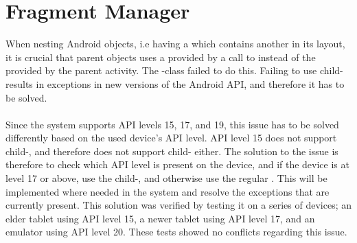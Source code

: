 \section{Fragment Manager}
\label{sec:fragment_manager}

When nesting Android  objects, i.e having a  which contains another  in its layout, it is crucial that parent  objects uses a  provided by a call to  instead of the  provided by the parent activity. The \giraf-class  failed to do this. Failing to use child- results in exceptions in new versions of the Android API, and therefore it has to be solved. 
\\\\

Since the \giraf system supports API levels 15, 17, and 19, this issue has to be solved differently based on the used device's API level. API level 15 does not support child-, and therefore does not support child- either. The solution to the issue is therefore to check which API level is present on the device, and if the device is at level 17 or above, use the child-, and otherwise use the regular . This will be implemented where needed in the \giraf system and resolve the exceptions that are currently present. This solution was verified by testing it on a series of devices; an elder tablet using API level 15, a newer tablet using API level 17, and an emulator using API level 20. These tests showed no conflicts regarding this issue.
